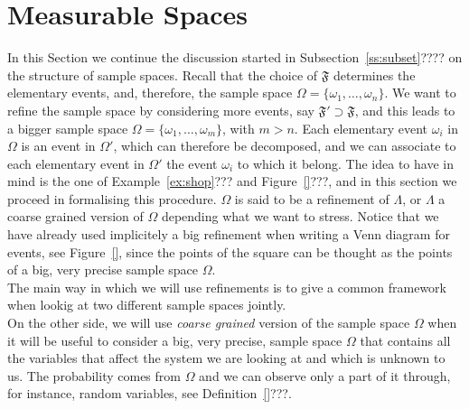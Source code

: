 
\section{ Measurable Spaces}
	\label{s:sys}
	In this Section we continue the discussion started in Subsection~\ref{ss:subset}???? on the structure of sample spaces. Recall that the choice of $\mathfrak F$ determines the elementary events, and, therefore, the sample space $\Omega= \{\omega_1, \ldots, \omega_n\}$. We want to refine the sample space by considering more events, say $\mathfrak F' \supset \mathfrak F$, and this leads to a bigger sample space $\Omega = \{\omega_1, \ldots, \omega_m\}$, with $m > n$. Each elementary event $\omega_i$ in $\Omega$ is an event in $\Omega'$, which can therefore be decomposed, and we can associate to each elementary event in $\Omega'$ the event $\omega_i$ to which it belong. The idea to have in mind is the one of Example~\ref{ex:shop}??? and Figure~\ref{}???, and in this section we proceed in formalising this procedure. $\Omega$ is said to be a refinement of $\Lambda$, or $\Lambda$ a coarse grained version of $\Omega$ depending what we want to stress. Notice that we have already used implicitely a big refinement when writing a Venn diagram for events, see Figure~\ref{}, since the points of the square can be thought as the points of a big, very precise sample space $\Omega$. \\
	The main way in which we will use refinements is to give a common framework when lookig at two different sample spaces jointly.\\
	 On the other side, we will use \emph{coarse grained} version of the sample space $\Omega$ when it will be useful to consider a big, very precise, sample space $\Omega$ that contains all the variables that affect the system we are looking at and which is unknown to us. The probability comes from $\Omega$ and we can observe only a part of it through, for instance,  random variables, see Definition~\ref{}???.   

